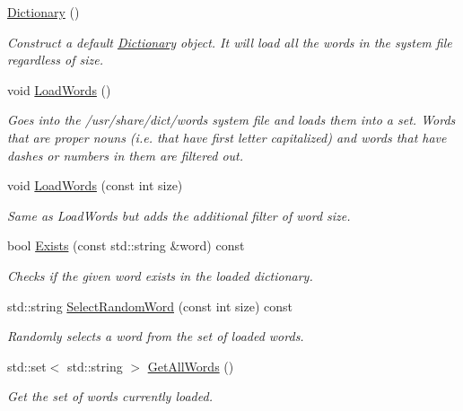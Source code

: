 \begin{DoxyCompactItemize}
\item 
\mbox{\label{classgame_1_1Dictionary_a89100f68c563cb86629343bdf46a0838}} 
\hyperlink{classgame_1_1Dictionary_a89100f68c563cb86629343bdf46a0838}{Dictionary} ()
\begin{DoxyCompactList}\small\item\em Construct a default \hyperlink{classgame_1_1Dictionary}{Dictionary} object. It will load all the words in the system file regardless of size. \end{DoxyCompactList}\item 
\mbox{\label{classgame_1_1Dictionary_a2033b05d73fd3fc7f5de4722bf8cae17}} 
void \hyperlink{classgame_1_1Dictionary_a2033b05d73fd3fc7f5de4722bf8cae17}{Load\+Words} ()
\begin{DoxyCompactList}\small\item\em Goes into the /usr/share/dict/words system file and loads them into a set. Words that are proper nouns (i.\+e. that have first letter capitalized) and words that have dashes or numbers in them are filtered out. \end{DoxyCompactList}\item 
void \hyperlink{classgame_1_1Dictionary_af2b2b73b84ba946ad6cf81251bde39f9}{Load\+Words} (const int size)
\begin{DoxyCompactList}\small\item\em Same as Load\+Words but adds the additional filter of word size. \end{DoxyCompactList}\item 
bool \hyperlink{classgame_1_1Dictionary_ab799d311640149a54645e2d1d2fd2c85}{Exists} (const std\+::string \&word) const
\begin{DoxyCompactList}\small\item\em Checks if the given word exists in the loaded dictionary. \end{DoxyCompactList}\item 
std\+::string \hyperlink{classgame_1_1Dictionary_aef5f57bd6ea644ba79c1982b8a5f5f33}{Select\+Random\+Word} (const int size) const
\begin{DoxyCompactList}\small\item\em Randomly selects a word from the set of loaded words. \end{DoxyCompactList}\item 
std\+::set$<$ std\+::string $>$ \hyperlink{classgame_1_1Dictionary_a7e0711a581d356b2106ef1a0ecbb00bf}{Get\+All\+Words} ()
\begin{DoxyCompactList}\small\item\em Get the set of words currently loaded. \end{DoxyCompactList}\end{DoxyCompactItemize}


